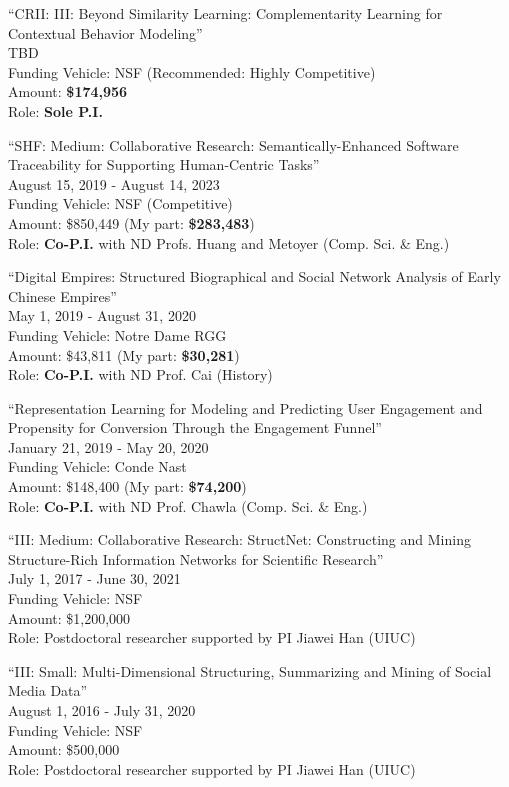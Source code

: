 \documentclass[10pt]{article}
\newenvironment{myindentpar}[1]%
{\begin{list}{}%
         {\setlength{\leftmargin}{#1}}%
         \item[]%
}
{\end{list}}
\newcounter{list}
\begin{document}
\begin{myindentpar}{0.75cm}

\hspace{-0.75cm}``CRII: III: Beyond Similarity Learning: Complementarity Learning for Contextual Behavior Modeling''\\
TBD \\
Funding Vehicle: NSF (Recommended: Highly Competitive) \\
Amount: \textbf{\$174,956} \\
Role: \textbf{Sole P.I.}

\hspace{-0.75cm}``SHF: Medium: Collaborative Research: Semantically-Enhanced Software Traceability for Supporting Human-Centric Tasks''\\
August 15, 2019 - August 14, 2023 \\
Funding Vehicle: NSF (Competitive) \\
Amount: \$850,449 (My part: \textbf{\$283,483}) \\
Role: \textbf{Co-P.I.} with ND Profs. Huang and Metoyer (Comp. Sci. \& Eng.)

\hspace{-0.75cm}``Digital Empires: Structured Biographical and Social Network Analysis of Early Chinese Empires''\\
May 1, 2019 - August 31, 2020 \\
Funding Vehicle: Notre Dame RGG \\
Amount: \$43,811 (My part: \textbf{\$30,281}) \\
Role: \textbf{Co-P.I.} with ND Prof. Cai (History)

\hspace{-0.75cm}``Representation Learning for Modeling and Predicting User Engagement and Propensity for Conversion Through the Engagement Funnel''\\
January 21, 2019 - May 20, 2020 \\
Funding Vehicle: Conde Nast \\
Amount: \$148,400 (My part: \textbf{\$74,200}) \\
Role: \textbf{Co-P.I.} with ND Prof. Chawla (Comp. Sci. \& Eng.)

\hspace{-0.75cm}``III: Medium: Collaborative Research: StructNet: Constructing and Mining Structure-Rich Information Networks for Scientific Research''\\
July 1, 2017 - June 30, 2021 \\
Funding Vehicle: NSF \\
Amount: \$1,200,000 \\
Role: Postdoctoral researcher supported by PI Jiawei Han (UIUC)

\hspace{-0.75cm}``III: Small: Multi-Dimensional Structuring, Summarizing and Mining of Social Media Data''\\
August 1, 2016 - July 31, 2020 \\
Funding Vehicle: NSF \\
Amount: \$500,000 \\
Role: Postdoctoral researcher supported by PI Jiawei Han (UIUC)

\end{myindentpar}
\end{document}
